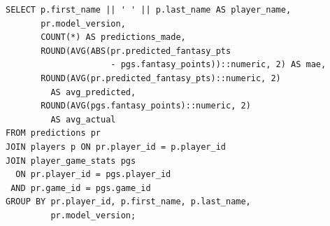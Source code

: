 \documentclass[12pt,a4paper]{article}
\begin{document}
\begin{lstlisting}
SELECT p.first_name || ' ' || p.last_name AS player_name,
       pr.model_version,
       COUNT(*) AS predictions_made,
       ROUND(AVG(ABS(pr.predicted_fantasy_pts
                     - pgs.fantasy_points))::numeric, 2) AS mae,
       ROUND(AVG(pr.predicted_fantasy_pts)::numeric, 2)
         AS avg_predicted,
       ROUND(AVG(pgs.fantasy_points)::numeric, 2)
         AS avg_actual
FROM predictions pr
JOIN players p ON pr.player_id = p.player_id
JOIN player_game_stats pgs
  ON pr.player_id = pgs.player_id
 AND pr.game_id = pgs.game_id
GROUP BY pr.player_id, p.first_name, p.last_name,
         pr.model_version;
\end{lstlisting}
\end{document}
